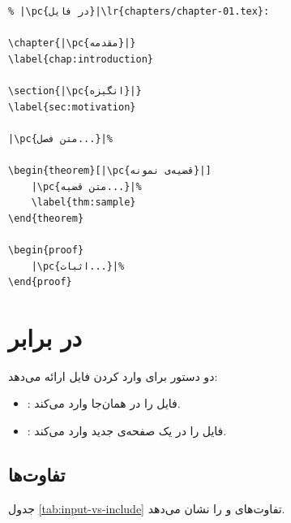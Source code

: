 \begin{latin}
\begin{verbatim}
% |\pc{در فایل}|\lr{chapters/chapter-01.tex}:

\chapter{|\pc{مقدمه}|}
\label{chap:introduction}

\section{|\pc{انگیزه}|}
\label{sec:motivation}

|\pc{متن فصل...}|%

\begin{theorem}[|\pc{قضیه‌ی نمونه}|]
    |\pc{متن قضیه...}|%
    \label{thm:sample}
\end{theorem}

\begin{proof}
    |\pc{اثبات...}|%
\end{proof}
\end{verbatim}
\end{latin}


\section{ در برابر }
\label{sec:large-projects-input-include}

 دو دستور برای وارد کردن فایل
ارائه می‌دهد:

\begin{itemize}
    \item {}: فایل را در
    همان‌جا وارد می‌کند.
    \item {}: فایل را
    در یک صفحه‌ی جدید وارد می‌کند.
\end{itemize}

\subsection{تفاوت‌ها}
\label{sec:large-projects-differences}

جدول \cref{tab:input-vs-include} تفاوت‌های
 و  را نشان می‌دهد.

